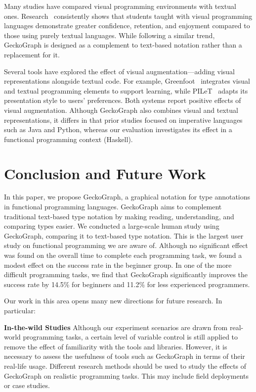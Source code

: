 \documentclass[preprint,12pt]{elsarticle}
\begin{document}
Many studies have compared visual programming environments with textual ones. 
Research~\cite{Noone2018-wl, Da_Silva_Ribeiro2014-tm, Cliburn2008-jo, Daly2011-is} consistently shows that students taught with visual programming languages demonstrate greater confidence, retention, and enjoyment compared to those using purely textual languages. 
While following a similar trend, GeckoGraph is designed as a complement to text-based notation rather than a replacement for it.

Several tools have explored the effect of visual augmentation—adding visual representations alongside textual code. 
For example, Greenfoot~\cite{Montero2010-uh} integrates visual and textual programming elements to support learning, while PILeT~\cite{Alshaigy2015-wy} adapts its presentation style to users’ preferences. 
Both systems report positive effects of visual augmentation. 
Although GeckoGraph also combines visual and textual representations, it differs in that prior studies focused on imperative languages such as Java and Python, whereas our evaluation investigates its effect in a functional programming context (Haskell).


\section{Conclusion and Future Work} \label{sec:conclusion}
In this paper, we propose GeckoGraph, a graphical notation for type annotations in functional programming languages. GeckoGraph aims to complement traditional text-based type notation by making reading, understanding, and comparing types easier. We conducted a large-scale human study using GeckoGraph, comparing it to text-based type notation. This is the largest user study on functional programming we are aware of. Although no significant effect was found on the overall time to complete each programming task, we found a modest effect on the success rate in the beginner group. In one of the more difficult programming tasks, we find that GeckoGraph significantly improves the success rate by 14.5\% for beginners and 11.2\% for less experienced programmers.

Our work in this area opens many new directions for future research.  In particular:

\noindent\textbf{In-the-wild Studies}
Although our experiment scenarios are drawn from real-world programming tasks, a certain level of variable control is still applied to remove the effect of familiarity with the tools and libraries. However, it is necessary to assess the usefulness of tools such as GeckoGraph in terms of their real-life usage. Different research methods should be used to study the effects of GeckoGraph on realistic programming tasks. This may include field deployments or case studies. 
\end{document}
